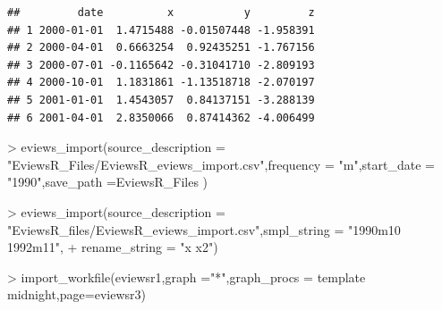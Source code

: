 \documentclass[
]{article}
\newenvironment{Shaded}{\begin{snugshade}}{\end{snugshade}}
\newcommand{\AttributeTok}[1]{\textcolor[rgb]{0.77,0.63,0.00}{#1}}
\newcommand{\FunctionTok}[1]{\textcolor[rgb]{0.00,0.00,0.00}{#1}}
\newcommand{\NormalTok}[1]{#1}
\newcommand{\SpecialCharTok}[1]{\textcolor[rgb]{0.00,0.00,0.00}{#1}}
\newcommand{\StringTok}[1]{\textcolor[rgb]{0.31,0.60,0.02}{#1}}
\begin{document}
\begin{verbatim}
##         date          x           y         z
## 1 2000-01-01  1.4715488 -0.01507448 -1.958391
## 2 2000-04-01  0.6663254  0.92435251 -1.767156
## 3 2000-07-01 -0.1165642 -0.31041710 -2.809193
## 4 2000-10-01  1.1831861 -1.13518718 -2.070197
## 5 2001-01-01  1.4543057  0.84137151 -3.288139
## 6 2001-04-01  2.8350066  0.87414362 -4.006499
\end{verbatim}

\begin{Shaded}
\begin{Highlighting}[]
\SpecialCharTok{\textgreater{}} \FunctionTok{eviews\_import}\NormalTok{(}\AttributeTok{source\_description =} \StringTok{"EviewsR\_Files/EviewsR\_eviews\_import.csv"}\NormalTok{,}\AttributeTok{frequency =} \StringTok{"m"}\NormalTok{,}\AttributeTok{start\_date =} \StringTok{"1990"}\NormalTok{,}\AttributeTok{save\_path =}\StringTok{\textquotesingle{}EviewsR\_Files\textquotesingle{}}\NormalTok{ )}
\end{Highlighting}
\end{Shaded}

\begin{Shaded}
\begin{Highlighting}[]
\SpecialCharTok{\textgreater{}} \FunctionTok{eviews\_import}\NormalTok{(}\AttributeTok{source\_description =} \StringTok{"EviewsR\_files/EviewsR\_eviews\_import.csv"}\NormalTok{,}\AttributeTok{smpl\_string =} \StringTok{"1990m10 1992m11"}\NormalTok{,}
\SpecialCharTok{+} \AttributeTok{rename\_string =} \StringTok{"x x2"}\NormalTok{)}
\end{Highlighting}
\end{Shaded}

\begin{Shaded}
\begin{Highlighting}[]
\SpecialCharTok{\textgreater{}} \FunctionTok{import\_workfile}\NormalTok{(}\StringTok{\textquotesingle{}eviewsr1\textquotesingle{}}\NormalTok{,}\AttributeTok{graph =}\StringTok{"*"}\NormalTok{,}\AttributeTok{graph\_procs =} \StringTok{\textquotesingle{}template midnight\textquotesingle{}}\NormalTok{,}\AttributeTok{page=}\StringTok{\textquotesingle{}eviewsr3\textquotesingle{}}\NormalTok{)}
\end{Highlighting}
\end{Shaded}
\end{document}
